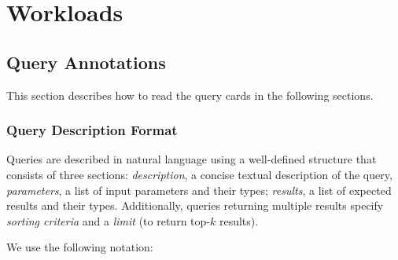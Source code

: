 \chapter{Workloads}
\label{sec:workloads}

\section{Query Annotations}

This section describes how to read the query cards in the following sections.
\subsection{Query Description Format}
\label{subsec:query-description-format}

Queries are described in natural language using a well-defined structure that consists of three sections:
\textit{description}, a concise textual description of the query,
\textit{parameters}, a list of input parameters and their types;
\textit{results}, a list of expected results and their types.
Additionally, queries returning multiple results specify \emph{sorting criteria} and a \emph{limit} (to return top-$k$ results).

We use the following notation:

